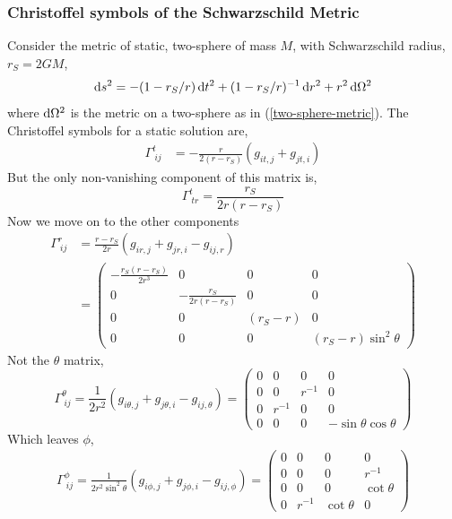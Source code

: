 \subsubsection{Christoffel symbols of the Schwarzschild  Metric}
Consider the metric of static, two-sphere of mass $M$, with Schwarzschild radius, $r_S = 2GM$,
\begin{equation}
    \operatorname{d}\!{s}^2 = -(1-r_S/r)\operatorname{d}\!{t}^2 + (1-r_S/r)^{-1}\operatorname{d}\!{r}^2 + r^2\operatorname{d}\!{\Omega}^2
\end{equation}
where $\operatorname{d}\!{\Omega}^2$ is the metric on a two-sphere as in (\ref{two-sphere-metric}).
The Christoffel symbols for a static solution are,  
\begin{equation}
    \begin{split}
        \Gamma^{t}_{\ ij} &= -\frac{r}{2(r-r_S)}\left(g_{it,j} + g_{jt,i}\right) 
    \end{split}
\end{equation}
But the only non-vanishing component of this matrix is, 
\begin{equation}
    \Gamma^{t}_{\ tr} = \frac{r_S}{2r(r-r_S)} 
\end{equation}
Now we move on to the other components
\begin{equation}
\begin{split}
    \Gamma^{r}_{\ ij} &= \frac{r-r_S}{2r}\left(g_{ir,j} + g_{jr,i} - g_{ij,r}\right)\\ 
    &=
    \begin{pmatrix}
        -\frac{r_S(r-r_S)}{2r^3} & 0 & 0 & 0 \\
        0 & -\frac{r_S}{2r(r-r_S)} & 0 & 0 \\
        0 & 0 & (r_S-r) & 0 \\
        0 & 0 & 0 & (r_S-r)\sin^2\theta 
    \end{pmatrix}
\end{split}
\end{equation}
Not the $\theta$ matrix,
\begin{equation}
    \Gamma^{\theta}_{\ ij} = \frac{1}{2r^2}\left(g_{i\theta,j} + g_{j\theta,i} - g_{ij,\theta}\right) = 
    \begin{pmatrix}
        0 & 0 & 0 & 0 \\
        0 & 0 & r^{-1} & 0 \\
        0 & r^{-1} & 0 & 0 \\
        0 & 0 & 0 & -\sin\theta\cos\theta
    \end{pmatrix}
\end{equation}
Which leaves $\phi$,
\begin{eqnarray}
    \Gamma^{\phi}_{\ ij} = \frac{1}{2r^2\sin^2\theta}\left(g_{i\phi,j} + g_{j\phi,i} - g_{ij,\phi}\right)= 
    \begin{pmatrix}
        0 & 0 & 0 & 0 \\
        0 & 0 & 0 & r^{-1} \\
        0 & 0 & 0 & \cot\theta  \\
        0 & r^{-1} & \cot\theta & 0
    \end{pmatrix}
\end{eqnarray}

